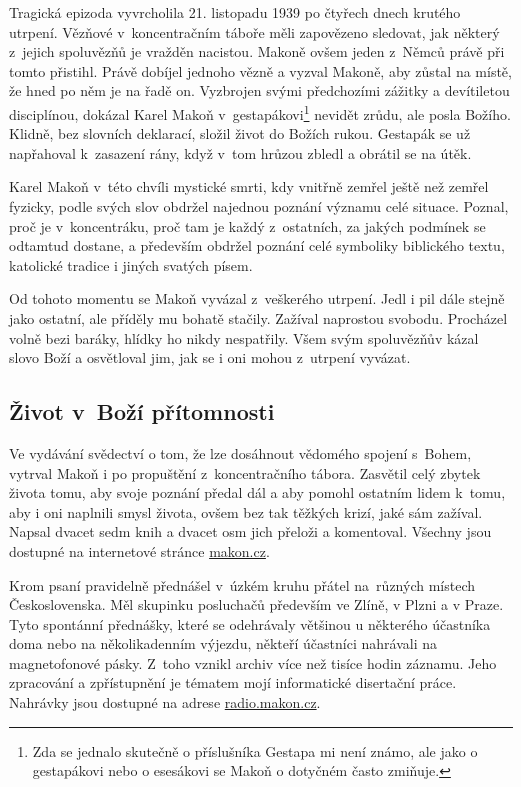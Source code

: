 Tragická epizoda vyvrcholila 21. listopadu 1939 po čtyřech dnech krutého utrpení. Vězňové
v~koncentračním táboře měli zapovězeno sledovat, jak některý z~jejich spoluvězňů
je vražděn nacistou. Makoně ovšem jeden z~Němců právě při tomto přistihl. Právě
dobíjel jednoho vězně a vyzval Makoně, aby zůstal na místě, že hned po něm je na
řadě on. Vyzbrojen svými předchozími zážitky a devítiletou disciplínou, dokázal
Karel Makoň v~gestapákovi\footnote{Zda se jednalo skutečně o příslušníka Gestapa
mi není známo, ale jako o gestapákovi nebo o esesákovi se Makoň o dotyčném často
zmiňuje.} nevidět zrůdu, ale posla Božího. Klidně, bez slovních deklarací,
složil život do Božích rukou. Gestapák se už napřahoval k~zasazení rány, když
v~tom hrůzou zbledl a obrátil se na útěk.

Karel Makoň v~této chvíli mystické smrti, kdy vnitřně zemřel ještě než zemřel
fyzicky, podle svých slov obdržel najednou poznání významu celé situace. Poznal,
proč je v~koncentráku, proč tam je každý z~ostatních, za jakých podmínek se
odtamtud dostane, a především obdržel poznání celé symboliky biblického textu,
katolické tradice i jiných svatých písem.

Od tohoto momentu se Makoň vyvázal z~veškerého utrpení. Jedl i pil dále stejně
jako ostatní, ale příděly mu bohatě stačily. Zažíval naprostou svobodu.
Procházel volně bezi baráky, hlídky ho nikdy nespatřily. Všem svým spoluvězňův
kázal slovo Boží a osvětloval jim, jak se i oni mohou z~utrpení vyvázat.

\subsection{Život v~Boží přítomnosti}

Ve vydávání svědectví o tom, že lze dosáhnout vědomého spojení s~Bohem, vytrval
Makoň i po propuštění z~koncentračního tábora. Zasvětil celý zbytek života tomu,
aby svoje poznání předal dál a aby pomohl ostatním lidem k~tomu, aby i oni
naplnili smysl života, ovšem bez tak těžkých krizí, jaké sám zažíval. Napsal
dvacet sedm knih a dvacet osm jich přeloži a komentoval. Všechny jsou dostupné
na internetové stránce \url{makon.cz}.

Krom psaní pravidelně přednášel v~úzkém kruhu přátel na~různých místech
Československa. Měl skupinku posluchačů především ve Zlíně, v Plzni a v Praze.
Tyto spontánní přednášky, které se odehrávaly většinou u některého účastníka
doma nebo na několikadenním výjezdu, někteří účastníci nahrávali na
magnetofonové pásky. Z~toho vznikl archiv více než tisíce hodin záznamu. Jeho
zpracování a zpřístupnění je tématem mojí informatické disertační
práce\cite{kruuza2021iterativni}. Nahrávky jsou dostupné na adrese
\url{radio.makon.cz}.

